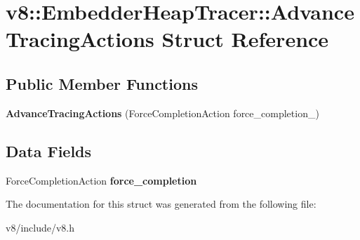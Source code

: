 \hypertarget{structv8_1_1EmbedderHeapTracer_1_1AdvanceTracingActions}{}\section{v8\+:\+:Embedder\+Heap\+Tracer\+:\+:Advance\+Tracing\+Actions Struct Reference}
\label{structv8_1_1EmbedderHeapTracer_1_1AdvanceTracingActions}
\subsection*{Public Member Functions}
\begin{DoxyCompactItemize}
\item 
\mbox{\label{structv8_1_1EmbedderHeapTracer_1_1AdvanceTracingActions_aa15ac285cba1f133761ab86694a2247d}} 
{\bfseries Advance\+Tracing\+Actions} (Force\+Completion\+Action force\+\_\+completion\+\_\+)
\end{DoxyCompactItemize}
\subsection*{Data Fields}
\begin{DoxyCompactItemize}
\item 
\mbox{\label{structv8_1_1EmbedderHeapTracer_1_1AdvanceTracingActions_a99fc514e0e69669fdec964c14ed16925}} 
Force\+Completion\+Action {\bfseries force\+\_\+completion}
\end{DoxyCompactItemize}


The documentation for this struct was generated from the following file\+:\begin{DoxyCompactItemize}
\item 
v8/include/v8.\+h\end{DoxyCompactItemize}
